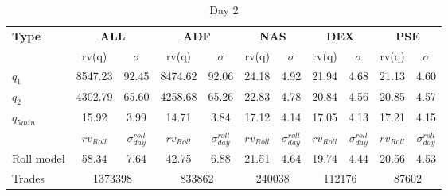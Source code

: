 \documentclass{article}
\begin{document}
\begin{table}[h!]
\centering
\begin{adjustbox}{width=\textwidth}
\begin{tabular}{lcccccccccc}
\toprule
\textbf{Type} & \multicolumn{2}{c}{\textbf{ALL}} & \multicolumn{2}{c}{\textbf{ADF}} & \multicolumn{2}{c}{\textbf{NAS}} & \multicolumn{2}{c}{\textbf{DEX}} & \multicolumn{2}{c}{\textbf{PSE}} \\
\cmidrule(lr){2-3} \cmidrule(lr){4-5} \cmidrule(lr){6-7} \cmidrule(lr){8-9} \cmidrule(lr){10-11}
 & rv(q) & $\sigma$ & rv(q) & $\sigma$ & rv(q) & $\sigma$ & rv(q) & $\sigma$ & rv(q) & $\sigma$ \\
\midrule
$q_1$       & 8547.23 & 92.45 & 8474.62 & 92.06 & 24.18 & 4.92  & 21.94 & 4.68  & 21.13 & 4.60  \\
$q_2$        & 4302.79 & 65.60 & 4258.68 & 65.26 & 22.83 & 4.78  & 20.84 & 4.56  & 20.85 & 4.57  \\
$q_{5min}$   & 15.92  & 3.99  & 14.71  & 3.84  & 17.12 & 4.14  & 17.05 & 4.13  & 17.21 & 4.15  \\
\midrule
& {$rv_{Roll}$} & {$\sigma_{day}^{roll}$} & {$rv_{Roll}$} & {$\sigma_{day}^{roll}$} & {$rv_{Roll}$} & {$\sigma_{day}^{roll}$}& {$rv_{Roll}$} & {$\sigma_{day}^{roll}$}& {$rv_{Roll}$} & {$\sigma_{day}^{roll}$} \\
Roll model & 58.34  & 7.64  & 42.75  & 6.88  & 21.51 & 4.64  & 19.74 & 4.44  & 20.56 & 4.53  \\
Trades     & \multicolumn{2}{c}{1373398} & \multicolumn{2}{c}{833862} & \multicolumn{2}{c}{240038} & \multicolumn{2}{c}{112176} & \multicolumn{2}{c}{87602} \\
\bottomrule
\end{tabular}
\end{adjustbox}
\caption{Day 2}
\label{tab:updated_summary_table}
\end{table}
\end{document}
